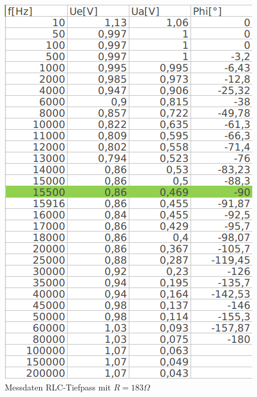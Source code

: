 \documentclass[12pt,a4paper,titlepage]{article}
\begin{document}
\begin{figure}[H]
\begin{minipage}[b]{0.3\textwidth}
    \includegraphics[width=\textwidth]{rlc_180_data.png}
    \caption{Messdaten RLC-Tiefpass mit $R=183\Omega$}
  \end{minipage}
  \hfill
  \begin{minipage}[b]{0.3\textwidth}

\end{minipage}
\end{figure}
\end{document}
